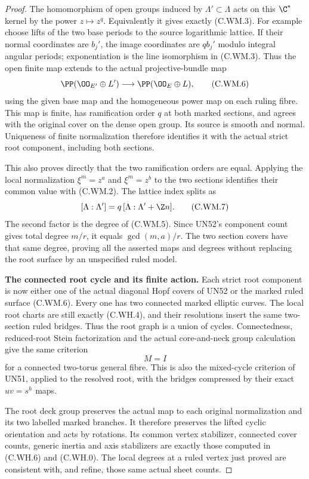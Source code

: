 \begin{proof}
The homomorphism of open groups induced by
$\Lambda'\subset\Lambda$ acts on this
$\C^*$ kernel by the power $z\mapsto z^q$.
Equivalently it gives exactly (C.WM.3).
For example choose lifts of the two base
periods to the source logarithmic lattice.
If their normal coordinates are $b_j'$,
the image coordinates are $qb_j'$ modulo
integral angular periods; exponentiation
is the line isomorphism in (C.WM.3).
Thus the open finite map extends to the
actual projective-bundle map
\[
 \PP(\OO_{E'}\oplus L')
          \longrightarrow \PP(\OO_E\oplus L),
\tag{C.WM.6}
\]
using the given base map and the homogeneous
power map on each ruling fibre.
This map is finite, has ramification order
$q$ at both marked sections, and agrees
with the original cover on the dense open
group. Its source is smooth and normal.
Uniqueness of finite normalization therefore
identifies it with the actual strict root
component, including both sections.

This also proves directly that the two
ramification orders are equal. Applying
the local normalization
$\xi^m=z^a$ and $\xi^m=z^b$ to the two
sections identifies their common value
with (C.WM.2). The lattice index splits as
\[
 [\Lambda:\Lambda']
     =q\,[\Lambda:\Lambda'+\Z n].
\tag{C.WM.7}
\]
The second factor is the degree of (C.WM.5).
Since UN52's component count gives total
degree $m/r$, it equals $\gcd(m,a)/r$.
The two section covers have that same
degree, proving all the asserted maps
and degrees without replacing the root
surface by an unspecified ruled model.

\par\medskip\noindent\textbf{The connected root cycle and its finite action.}
Each strict root component is now either
one of the actual diagonal Hopf covers of
UN52 or the marked ruled surface (C.WM.6).
Every one has two connected marked elliptic
curves. The local root charts are still
exactly (C.WH.4), and their resolutions
insert the same two-section ruled bridges.
Thus the root graph is a union of cycles.
Connectedness, reduced-root Stein factorization
and the actual core-and-neck group calculation
give the same criterion
\[
                         M=I
\tag{C.WM.8}
\]
for a connected two-torus general fibre.
This is also the mixed-cycle criterion
of UN51, applied to the resolved root,
with the bridges compressed by their
exact $uv=s^h$ maps.

The root deck group preserves the actual
map to each original normalization and
its two labelled marked branches. It
therefore preserves the lifted cyclic
orientation and acts by rotations.
Its common vertex stabilizer, connected
cover counts, generic inertia and axis
stabilizers are exactly those computed
in (C.WH.6) and (C.WH.0). The local
degrees at a ruled vertex just proved
are consistent with, and refine, those
same actual sheet counts.


\end{proof}
